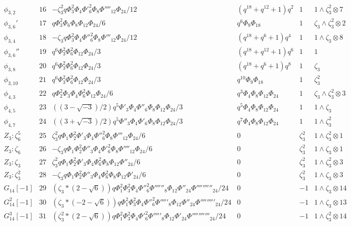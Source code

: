 \documentclass{article}
\begin{document}
$$\begin{array}{c|ccccc}
\phi_{3,2}&16&-\zeta_3^2q\Phi_3^2\Phi_4\Phi'_6^2\Phi_8\Phi''''_{12}\Phi_{24}/12&(q^{18}+q^{12}+1)q^2&1&1\!\wedge\!\zeta_3^2\otimes7\\
\phi_{3,6}'&17&q\Phi_3^2\Phi_6\Phi_8\Phi_{12}\Phi_{24}/6&q^6\Phi_9\Phi_{18}&1&\zeta_3\!\wedge\!\zeta_3^2\otimes2\\
\phi_{3,4}&18&-\zeta_3q\Phi_3^2\Phi_4\Phi''_6^2\Phi_8\Phi'''_{12}\Phi_{24}/12&(q^{18}+q^6+1)q^4&1&1\!\wedge\!\zeta_3\otimes8\\
\phi_{3,6}''&19&q^6\Phi_3^2\Phi_6^2\Phi_{12}\Phi_{24}/3&(q^{18}+q^{12}+1)q^6&1&1\\
\phi_{3,8}&20&q^6\Phi_3^2\Phi_6^2\Phi_{12}\Phi_{24}/3&(q^{18}+q^6+1)q^8&1&\zeta_3\\
\phi_{3,10}&21&q^6\Phi_3^2\Phi_6^2\Phi_{12}\Phi_{24}/3&q^{10}\Phi_9\Phi_{18}&1&\zeta_3^2\\
\phi_{4,3}&22&q\Phi_2^2\Phi_3\Phi_4\Phi_6^2\Phi_{12}\Phi_{24}/6&q^3\Phi_4\Phi_8\Phi_{12}\Phi_{24}&1&\zeta_3\!\wedge\!\zeta_3^2\otimes3\\
\phi_{4,5}&23&((3-\sqrt{-3})/2)q^5\Phi'_3\Phi_4\Phi''_6\Phi_8\Phi_{12}\Phi_{24}/3&q^5\Phi_4\Phi_8\Phi_{12}\Phi_{24}&1&1\!\wedge\!\zeta_3\\
\phi_{4,7}&24&((3+\sqrt{-3})/2)q^5\Phi''_3\Phi_4\Phi'_6\Phi_8\Phi_{12}\Phi_{24}/3&q^7\Phi_4\Phi_8\Phi_{12}\Phi_{24}&1&1\!\wedge\!\zeta_3^2\\
Z_3:\zeta_6^5&25&\zeta_3^2q\Phi_1\Phi_2^2\Phi'_3\Phi_4\Phi''_6^2\Phi_8\Phi'''_{12}\Phi_{24}/6&0&\zeta_3^2&1\!\wedge\!\zeta_3^2\otimes1\\
Z_3:\zeta_6&26&-\zeta_3q\Phi_1\Phi_2^2\Phi''_3\Phi_4\Phi'_6^2\Phi_8\Phi''''_{12}\Phi_{24}/6&0&\zeta_3^2&1\!\wedge\!\zeta_3\otimes1\\
Z_3:\zeta_3&27&\zeta_3^2q\Phi_1\Phi_2^2\Phi'_3\Phi_4\Phi_6^2\Phi_8\Phi_{12}\Phi''_{24}/6&0&\zeta_3^2&1\!\wedge\!\zeta_3^2\otimes3\\
Z_3:\zeta_3^2&28&-\zeta_3q\Phi_1\Phi_2^2\Phi''_3\Phi_4\Phi_6^2\Phi_8\Phi_{12}\Phi'_{24}/6&0&\zeta_3^2&1\!\wedge\!\zeta_3\otimes3\\
G_{14}[-1]&29&(\zeta_3*(2-\sqrt{6}))q\Phi_1^2\Phi_3^2\Phi_4\Phi''_6^2\Phi''''''_8\Phi_{12}\Phi''_{24}\Phi''''''''''_{24}/24&0&-1&1\!\wedge\!\zeta_3\otimes14\\
G_{14}^2[-1]&30&(\zeta_3*(-2-\sqrt{6}))q\Phi_1^2\Phi_3^2\Phi_4\Phi''_6^2\Phi'''''_8\Phi_{12}\Phi''_{24}\Phi'''''''''_{24}/24&0&-1&1\!\wedge\!\zeta_3\otimes13\\
G_{14}^3[-1]&31&(\zeta_3^2*(2-\sqrt{6}))q\Phi_1^2\Phi_3^2\Phi_4\Phi'_6^2\Phi'''''_8\Phi_{12}\Phi'_{24}\Phi'''''''''''_{24}/24&0&-1&1\!\wedge\!\zeta_3^2\otimes14\\

\end{array}$$
\end{document}

